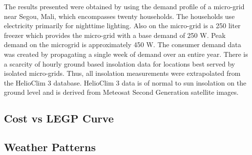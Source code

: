 \documentclass{article}
\begin{document}
The results presented were obtained by using the demand profile of a micro-grid near Segou, Mali, which encompasses twenty households.
The households use electricity primarily for nighttime lighting.
Also on the micro-grid is a 250 liter freezer which provides the micro-grid with a base demand of 250 W. Peak demand on the microgrid is approximately 450 W. 
The consumer demand data was created by propagating a single week of demand over an entire year.
There is a scarcity of hourly ground based insolation data for locations best served by isolated micro-grids. 
Thus, all insolation measurements were extrapolated from the HelioClim 3 database. HelioClim 3 data is of normal to sun insolation on the ground level and is derived from Meteosat Second Generation satellite images. 


\subsection{Cost vs LEGP Curve}

\subsection{Weather Patterns}
\end{document}
